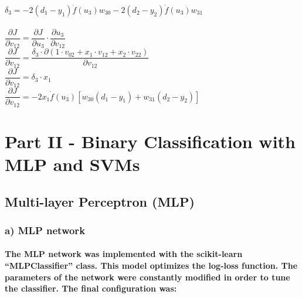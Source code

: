 \documentclass[a4paper]{article}    %
\begin{document}
%
$ \delta_3 = - 2(d_1-y_1)\dot{f}(u_3)w_{30} - 2(d_2-y_2)\dot{f}(u_3)w_{31} $\\
\vspace{0.1mm}\\
%
$ \dfrac{\partial J}{\partial v_{12}} = \dfrac{\partial J}{\partial u_3} \cdot \dfrac{\partial u_3}{\partial v_{12}} $\\
$ \dfrac{\partial J}{\partial v_{12}} = \dfrac{\delta_3 \cdot \partial(1 \cdot v_{02} + x_1 \cdot v_{12} + x_2 \cdot v_{22})}{\partial v_{12}} $\\
$ \dfrac{\partial J}{\partial v_{12}} = \delta_3 \cdot x_1 $\\
$ \boxed{ \dfrac{\partial J}{\partial v_{12}} = -2x_1\dot{f}(u_3)[w_{30}(d_1-y_1) + w_{31}(d_2-y_2)] }$\\
\vspace{0.1mm}

\section{Part II - Binary Classification with MLP and SVMs}

\subsection{Multi-layer Perceptron (MLP)}

\subsubsection{a) MLP network}

\paragraph{The MLP network was implemented with the scikit-learn ``MLPClassifier'' class. This model optimizes the log-loss function. The parameters of the network were constantly modified in order to tune the classifier. The final configuration was:}
\end{document}
